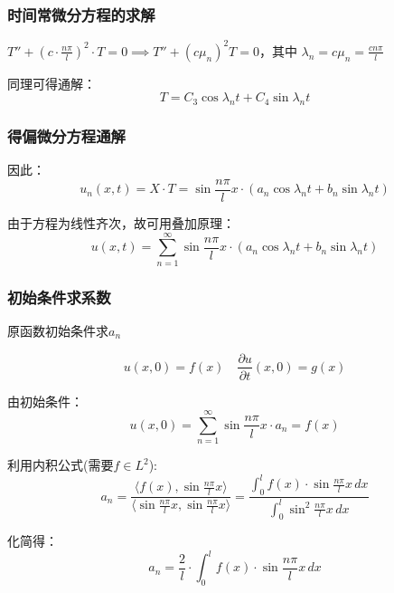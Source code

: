 \documentclass[12pt,a4paper]{article}
\numberwithin{subsection}{section}
\numberwithin{subsubsection}{subsection}
\theoremstyle{plain}
\theoremstyle{definition}
\theoremstyle{remark}
\begin{document}
	
	\subsubsection{时间常微分方程的求解}
	\(T'' + \left(c \cdot \frac{n\pi}{l}\right)^2 \cdot T = 0 \implies T'' + (c \mu_n)^2 T = 0\)，其中 \(\lambda_n = c \mu_n = \frac{c n \pi}{l}\)
	
	同理可得通解：
	\begin{equation}
		T = C_3 \cos \lambda_n t + C_4 \sin \lambda_n t
	\end{equation}
	
	\subsubsection{得偏微分方程通解}
	因此：
	\begin{equation}
		u_n(x, t) = X \cdot T = \sin \frac{n\pi}{l} x \cdot (a_n \cos \lambda_n t + b_n \sin \lambda_n t)
	\end{equation}
	
	由于方程为线性齐次，故可用叠加原理：
	\begin{equation}
		u(x, t) = \sum_{n=1}^{\infty} \sin \frac{n\pi}{l} x \cdot (a_n \cos \lambda_n t + b_n \sin \lambda_n t)
	\end{equation}
	
\subsubsection{初始条件求系数}
原函数初始条件求$a_n$
	
	\begin{equation}
		u(x, 0) = f(x) \quad \frac{\partial u}{\partial t}(x, 0) = g(x)
	\end{equation}
	
	由初始条件：
	\begin{equation}
		u(x, 0) = \sum_{n=1}^{\infty} \sin \frac{n\pi}{l} x \cdot a_n = f(x)
	\end{equation}
	
	利用内积公式(需要$f \in L^2$):
	\begin{equation}
		a_n = \frac{\langle f(x), \sin \frac{n\pi}{l} x \rangle}{\langle \sin \frac{n\pi}{l} x, \sin \frac{n\pi}{l} x \rangle} = \frac{\int_0^l f(x) \cdot \sin \frac{n\pi}{l} x \, dx}{\int_0^l \sin^2 \frac{n\pi}{l} x \, dx}
	\end{equation}
	
	化简得：
	\begin{equation}
		a_n = \frac{2}{l} \cdot \int_0^l f(x) \cdot \sin \frac{n\pi}{l} x \, dx
	\end{equation}
	
\end{document}
